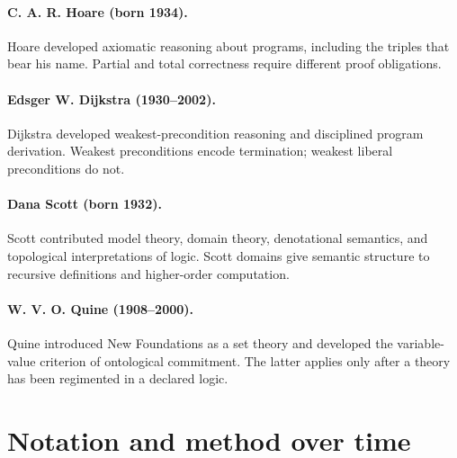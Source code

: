 \paragraph{C. A. R. Hoare (born 1934).}
Hoare developed axiomatic reasoning about programs, including the triples that
bear his name. Partial and total correctness require different proof
obligations.

\paragraph{Edsger W. Dijkstra (1930--2002).}
Dijkstra developed weakest-precondition reasoning and disciplined program
derivation. Weakest preconditions encode termination; weakest liberal
preconditions do not.

\paragraph{Dana Scott (born 1932).}
Scott contributed model theory, domain theory, denotational semantics, and
topological interpretations of logic. Scott domains give semantic structure to
recursive definitions and higher-order computation.

\paragraph{W. V. O. Quine (1908--2000).}
Quine introduced New Foundations as a set theory and developed the
variable-value criterion of ontological commitment.  The latter applies only
after a theory has been regimented in a declared logic.

\section{Notation and method over time}
\label{sec:p13-notation-history}

